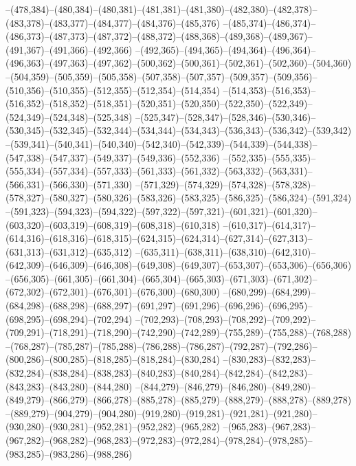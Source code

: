 --(478,384)--(480,384)--(480,381)--(481,381)--(481,380)--(482,380)--(482,378)--(483,378)--(483,377)--(484,377)--(484,376)--(485,376)
--(485,374)--(486,374)--(486,373)--(487,373)--(487,372)--(488,372)--(488,368)--(489,368)--(489,367)--(491,367)--(491,366)--(492,366)
--(492,365)--(494,365)--(494,364)--(496,364)--(496,363)--(497,363)--(497,362)--(500,362)--(500,361)--(502,361)--(502,360)--(504,360)
--(504,359)--(505,359)--(505,358)--(507,358)--(507,357)--(509,357)--(509,356)--(510,356)--(510,355)--(512,355)--(512,354)--(514,354)
--(514,353)--(516,353)--(516,352)--(518,352)--(518,351)--(520,351)--(520,350)--(522,350)--(522,349)--(524,349)--(524,348)--(525,348)
--(525,347)--(528,347)--(528,346)--(530,346)--(530,345)--(532,345)--(532,344)--(534,344)--(534,343)--(536,343)--(536,342)--(539,342)
--(539,341)--(540,341)--(540,340)--(542,340)--(542,339)--(544,339)--(544,338)--(547,338)--(547,337)--(549,337)--(549,336)--(552,336)
--(552,335)--(555,335)--(555,334)--(557,334)--(557,333)--(561,333)--(561,332)--(563,332)--(563,331)--(566,331)--(566,330)--(571,330)
--(571,329)--(574,329)--(574,328)--(578,328)--(578,327)--(580,327)--(580,326)--(583,326)--(583,325)--(586,325)--(586,324)--(591,324)
--(591,323)--(594,323)--(594,322)--(597,322)--(597,321)--(601,321)--(601,320)--(603,320)--(603,319)--(608,319)--(608,318)--(610,318)
--(610,317)--(614,317)--(614,316)--(618,316)--(618,315)--(624,315)--(624,314)--(627,314)--(627,313)--(631,313)--(631,312)--(635,312)
--(635,311)--(638,311)--(638,310)--(642,310)--(642,309)--(646,309)--(646,308)--(649,308)--(649,307)--(653,307)--(653,306)--(656,306)
--(656,305)--(661,305)--(661,304)--(665,304)--(665,303)--(671,303)--(671,302)--(672,302)--(672,301)--(676,301)--(676,300)--(680,300)
--(680,299)--(684,299)--(684,298)--(688,298)--(688,297)--(691,297)--(691,296)--(696,296)--(696,295)--(698,295)--(698,294)--(702,294)
--(702,293)--(708,293)--(708,292)--(709,292)--(709,291)--(718,291)--(718,290)--(742,290)--(742,289)--(755,289)--(755,288)--(768,288)
--(768,287)--(785,287)--(785,288)--(786,288)--(786,287)--(792,287)--(792,286)--(800,286)--(800,285)--(818,285)--(818,284)--(830,284)
--(830,283)--(832,283)--(832,284)--(838,284)--(838,283)--(840,283)--(840,284)--(842,284)--(842,283)--(843,283)--(843,280)--(844,280)
--(844,279)--(846,279)--(846,280)--(849,280)--(849,279)--(866,279)--(866,278)--(885,278)--(885,279)--(888,279)--(888,278)--(889,278)
--(889,279)--(904,279)--(904,280)--(919,280)--(919,281)--(921,281)--(921,280)--(930,280)--(930,281)--(952,281)--(952,282)--(965,282)
--(965,283)--(967,283)--(967,282)--(968,282)--(968,283)--(972,283)--(972,284)--(978,284)--(978,285)--(983,285)--(983,286)--(988,286)
